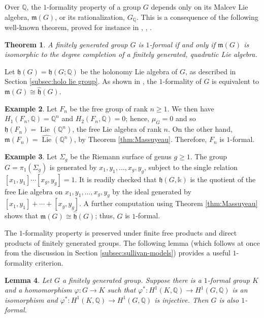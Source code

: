 \documentclass{article}
\numberwithin{equation}{section}
\newtheorem{theorem}{Theorem}[section]
\newtheorem{lemma}[theorem]{Lemma}
\theoremstyle{definition}
\newtheorem{example}[theorem]{Example}
\newcommand{\Q}{\mathbb{Q}}
\renewcommand{\k}{\mathbb{k}}
\newcommand{\h}{{\mathfrak{h}}}
\newcommand{\m}{{\mathfrak{m}}}
\DeclareMathOperator{\Lie}{Lie}
\begin{document}
Over $\Q$, the $1$-formality property of a group $G$ depends 
only on its Malcev Lie algebra, $\m(G)$, or its rationalization, $G_{\Q}$. 
This is a consequence of the following well-known theorem, proved for 
instance in \cite{CT}, \cite{MP}, \cite{SW-forum}.

\begin{theorem}
\label{thm:1f-group}
A finitely generated group $G$ is $1$-formal 
if and only if $\m(G)$ is isomorphic to the degree 
completion of a finitely generated, quadratic Lie algebra.
\end{theorem}

Let $\h(G)=\h(G;\Q)$ be the holonomy Lie algebra of $G$, as 
described in Section \ref{subsec:holo lie group}. As shown 
in \cite{PS-imrn04}, the $1$-formality of $G$ is equivalent 
to $\m(G)\cong \widehat{\h}(G)$. 

\begin{example}
\label{ex:free}
Let $F_n$ be the free group of rank $n\ge 1$.  We then have 
$H_1(F_n,\Q)=\Q^n$ and $H_2(F_n,\Q)=0$; hence, $\mu_{G}=0$ 
and so $\h(F_n)=\Lie(\Q^n)$, the free Lie algebra of rank $n$.  
On the other hand,  $\m(F_n)=\widehat{\Lie}(\Q^n)$, by 
Theorem \ref{thm:Massuyeau}. Therefore, $F_n$  is $1$-formal. 
\end{example}

\begin{example}
\label{ex:surface}
Let $\Sigma_g$ be the Riemann surface of genus $g\ge 1$.   
The group $G=\pi_1(\Sigma_g)$ is generated 
by $x_1,y_1,\dots,x_g,y_g$, subject to the single relation 
$[x_1,y_1]\cdots [x_g,y_g]=1$. It is readily checked that $\h(G,\k)$ 
is the quotient of the free Lie algebra on $x_1,y_1,\dots,x_g,y_g$  
by the ideal generated by $[x_1,y_1]+ \cdots + [x_g,y_g]$. 
A further computation using Theorem \ref{thm:Massuyeau} 
shows that $\m(G)\cong \widehat{\h}(G)$; thus, $G$ is $1$-formal. 
\end{example}
 
The $1$-formality property is preserved under finite free 
products and direct products of finitely generated groups.  
The following lemma (which follows at once from the discussion in 
Section \ref{subsec:sullivan-models}) provides a useful $1$-formality 
criterion. 

\begin{lemma}
\label{lem:1fg}
Let $G$ a finitely generated group. Suppose there is a $1$-formal 
group $K$ and a homomorphism $\varphi\colon G\to K$ such that 
$\varphi^*\colon H^1(K,\Q) \to H^1(G,\Q)$ is an isomorphism and 
$\varphi^*\colon H^1(K,\Q) \to H^1(G,\Q)$ is injective. Then $G$ 
is also $1$-formal.
\end{lemma}
\end{document}
